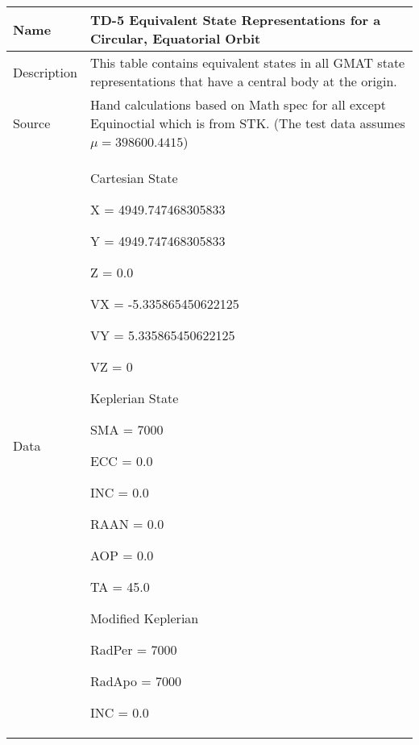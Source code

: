 \begin{table}[htbp!]
\centering
      \begin{tabular}{|p{1.0 in} |p{5.0 in} |}
         \hline
          \rowcolor[rgb]{0.8,0.8,0.8}  Name & TD-5 Equivalent State Representations for a Circular, Equatorial Orbit\\
         \hline
         Description & This table contains equivalent states in all GMAT state representations
         that have a central body at the origin.    \\ \hline
         Source &  Hand calculations based on Math spec for all except Equinoctial which is from STK.   (The test data assumes $\mu = 398600.4415$)\\
         \hline
         Data &
          \begin{compactenum}
              \item Cartesian State
              \begin{compactenum}
                  \item X = 4949.747468305833
                  \item Y = 4949.747468305833
                  \item Z = 0.0
                  \item VX = -5.335865450622125
                  \item VY = 5.335865450622125
                  \item VZ = 0
              \end{compactenum}
              \item Keplerian State
              \begin{compactenum}
                  \item SMA = 7000
                  \item ECC = 0.0
                  \item INC = 0.0
                  \item RAAN = 0.0
                  \item AOP = 0.0
                  \item TA = 45.0
              \end{compactenum}
              \item Modified Keplerian
               \begin{compactenum}
                  \item RadPer = 7000
                  \item RadApo = 7000
                  \item INC = 0.0

\end{compactenum}
\end{compactenum}
\end{tabular}
\end{table}
